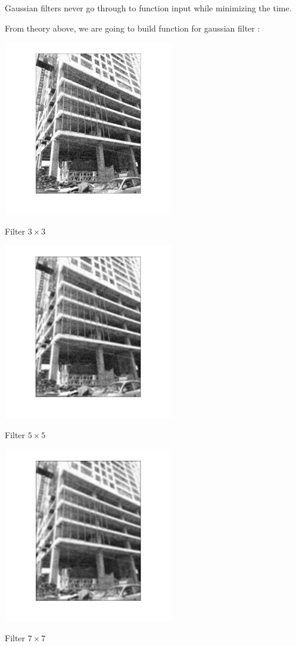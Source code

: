 Gaussian filters never go through to function input while minimizing the time.

\newpage
From theory above, we are going to build function for gaussian filter :

\begin{center}
	\includegraphics{gauc3.png}
	
	Filter $3\times3$
	
	\includegraphics{gauc5.png}
	
	Filter $5\times5$
	
	\includegraphics{gauc7.png}
	
	Filter $7\times7$
\end{center}

